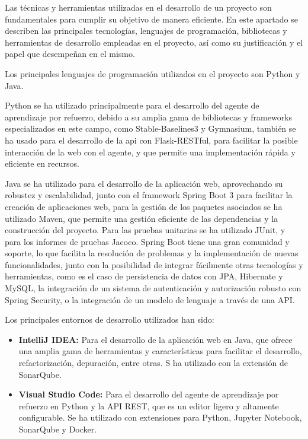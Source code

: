 Las técnicas y herramientas utilizadas en el desarrollo de un proyecto son fundamentales para cumplir su objetivo de manera eficiente. En este apartado se describen las principales tecnologías, lenguajes de programación, bibliotecas y herramientas de desarrollo empleadas en el proyecto, así como su justificación y el papel que desempeñan en el mismo.

Los principales lenguajes de programación utilizados en el proyecto son Python y Java.

Python se ha utilizado principalmente para el desarrollo del agente de aprendizaje por refuerzo, debido a su amplia gama de bibliotecas y frameworks especializados en este campo, como Stable-Baselines3 y Gymnasium, también se ha usado para el desarrollo de la api con Flask-RESTful, para facilitar la posible interacción de la web con el agente, y que permite una implementación rápida y eficiente en recursos.

Java se ha utilizado para el desarrollo de la aplicación web, aprovechando su robustez y escalabilidad, junto con el framework Spring Boot 3 para facilitar la creación de aplicaciones web, para la gestión de los paquetes asociados se ha utilizado Maven, que permite una gestión eficiente de las dependencias y la construcción del proyecto. Para las pruebas unitarias se ha utilizado JUnit, y para los informes de pruebas Jacoco. Spring Boot tiene una gran comunidad y soporte, lo que facilita la resolución de problemas y la implementación de nuevas funcionalidades, junto con la posibilidad de integrar fácilmente otras tecnologías y herramientas, como es el caso de persistencia de datos con JPA, Hibernate y MySQL, la integración de un sistema de autenticación y autorización robusto con Spring Security, o la integración de un modelo de lenguaje a través de una API.

Los principales entornos de desarrollo utilizados han sido:
\begin{itemize}
    \item \textbf{IntelliJ IDEA:} Para el desarrollo de la aplicación web en Java, que ofrece una amplia gama de herramientas y características para facilitar el desarrollo, refactorización, depuración, entre otras. S ha utilizado con la extensión de SonarQube.
    \item \textbf{Visual Studio Code:} Para el desarrollo del agente de aprendizaje por refuerzo en Python y la API REST, que es un editor ligero y altamente configurable. Se ha utilizado con extensiones para Python, Jupyter Notebook, SonarQube y Docker.
\end{itemize}

